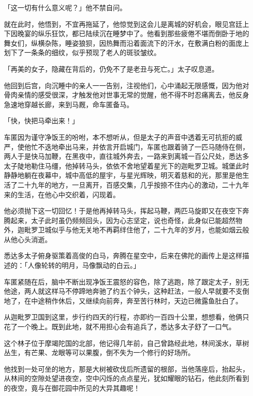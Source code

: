 \documentclass[12pt,twoside,openany]{book}
\begin{document}
「这一切有什么意义呢？」他不禁自问。

就在此时，他悟到，不宜再拖延了，他惊觉到这会儿是离城的好机会，眼见宫廷上下因晚宴的纵乐狂饮，都已陆续沉在睡梦中了。他看到那些疲倦不堪而倒卧于地的舞女们，纵横杂陈，睡姿狼狈，因热舞而沿着面流下的汗水，在敷满白粉的面庞上划下了一条条的细纹，似乎预现了老人的斑驳皱纹。

「再美的女子，隐藏在背后的，仍免不了是老丑与死亡。」太子叹息道。

他回到后宫，向沉睡中的亲人一一告别，注视他们，心中涌起无限感慨，因为他对骨肉亲情的感受很深，才触发他对世事无常的觉醒，他不得不时忍痛离去，他反身急速地穿越长廊，来到马厩，命车匿备马。

「快，快把马牵出来！」

车匿因为谨守净饭王的吩咐，本不想听从，但是太子的声音中透着无可抗拒的威严，使他忙不迭地牵出马来，并依言开启城门，车匿也跟着骑了一匹马随侍在侧，两人于是快马加鞭，在黑夜中，直往城外奔去，一路来到离城一百公尺处，悉达多太子陡地勒住马缰，他掉转马头，依依不舍地望着星光下的迦毗罗卫城。城堡此时静静地躺在夜幕中，城中高低的屋宇，与星光辉映，明灭着慈和的光，那里是他生活了二十九年的地方，一旦离开，百感交集，几乎按捺不住内心的激动，二十九年来的生活，在他心中交织着，闪现着。

他必须抛下这一切回忆！于是他再掉转马头，挥起马鞭，两匹马旋即又在夜空下奔腾起来，太子此时虽仍频频回头，因为心志坚定，说也奇怪，此身似已能超然物外，迦毗罗卫城似乎与他无关地不再羁绊住他了，二十九年的岁月，也能如烟云般从他心头消逝。

悉达多太子俯身驱策着高俊的白马，奔腾在星空中，后来在佛陀的画传上是这样描述的：「人像轮转的明月，马像飘动的白云。」

车匿紧随在后，脑中不断出现净饭王震怒的容色，除了逃跑，除了跟定太子，别无他途，两人就这样马不停蹄地奔驰了约五个钟头，这种赶法，一般人早就要不支倒地了，在中途稍作休后，又继续向前奔，奔至苦行林时，天边已微露鱼肚白了。

从迦毗罗卫国到这里，步行约四天的行程，亦即约一百四十公里，想想看，他俩只花了一个晚上。既到此地，就不用担心会有追兵了，悉达多太子舒了一口气。

这个林子位于摩竭陀国的北部，他记得几年前，自己曾路经此地，林间溪水，草树丛生，有芒果、龙眼等可以果腹，倒不失为一个修行的好场所。

他找到一处可坐的地方，那是大树被砍伐后所遗留的根部，当他落座后，抬起头，从林间的空隙处望进夜空，空中闪烁的点点星光，犹如耀眼的钻石，他此刻所看到的夜空，竟与在御花园中所见的大异其趣呢！
\end{document}
